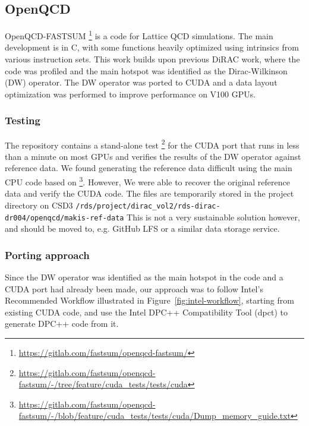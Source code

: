 
\subsection{OpenQCD}\label{sec:openqcd}

OpenQCD-FASTSUM \footnote{\url{https://gitlab.com/fastsum/openqcd-fastsum/}} is a code for Lattice QCD simulations. The main development is in C, with some functions heavily optimized using intrinsics from various instruction sets. This work builds upon previous DiRAC work, where the code was profiled and the main hotspot was identified as the Dirac-Wilkinson (DW) operator. The DW operator was ported to CUDA and a data layout optimization was performed to improve performance on V100 GPUs.

\subsubsection{Testing}\label{testing_openqcd}

The repository contains a stand-alone test \footnote{\url{https://gitlab.com/fastsum/openqcd-fastsum/-/tree/feature/cuda_tests/tests/cuda}} for the CUDA port that runs in less than a minute on most GPUs and verifies the results of the DW operator against reference data. We found generating the reference data difficult using the main CPU code based on \footnote{\url{https://gitlab.com/fastsum/openqcd-fastsum/-/blob/feature/cuda_tests/tests/cuda/Dump\_memory\_guide.txt}}. However, We were able to recover the original reference data and verify the CUDA code. The files are temporarily stored in the project directory on CSD3 \texttt{/rds/project/dirac\_vol2/rds-dirac-dr004/openqcd/makis-ref-data} This is not a very sustainable solution however, and should be moved to, e.g. GitHub LFS or a similar data storage service.


\subsubsection{Porting approach}\label{sec:openqcd_porting}

Since the DW operator was identified as the main hotspot in the code and a CUDA port had already been made, our approach was to follow Intel's Recommended Workflow illustrated in Figure~\ref{fig:intel-workflow}, starting from existing CUDA code, and use the Intel DPC++ Compatibility Tool (dpct) to generate DPC++ code from it.

